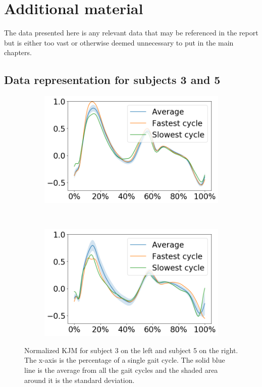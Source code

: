 

\chapter{Additional material}
\label{sec:appendix}
The data presented here is any relevant data that may be referenced in the report but is either too vast or otherwise deemed unnecessary to put in the main chapters.

\section{Data representation for subjects 3 and 5}
\label{sec:A-data-representation-4-subjects35}
\begin{figure}[ht!]
     \centering
     \begin{subfigure}[b]{0.328\textwidth}
         \centering
         \includegraphics[width=\textwidth]{img/results/moment_avg/subject03_all_set1_moment_avg_w_minmax.png}
     \end{subfigure}
     ~
     \begin{subfigure}[b]{0.328\textwidth}
         \centering
         \includegraphics[width=\textwidth]{img/results/moment_avg/subject05_all_set1_moment_avg_w_minmax.png}
     \end{subfigure}
    \caption{Normalized \ac{KJM} for subject 3 on the left and subject 5 on the right. The x-axis is the percentage of a single gait cycle. The solid blue line is the average from all the gait cycles and the shaded area around it is the standard deviation.}
    \label{fig:A-kjm-average}
\end{figure}
